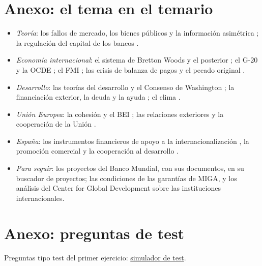 \documentclass[11pt]{article}
\begin{document}
\section{Anexo: el tema en el temario}\label{anexo:temas}

\begin{itemize}
\item \emph{Teoría}: los fallos de mercado, los bienes públicos y la información asimétrica  ; la regulación del capital de los bancos .
\item \emph{Economía internacional}: el sistema de Bretton Woods  y el posterior ; el G-20 y la OCDE ; el FMI ; las crisis de balanza de pagos y el pecado original .
\item \emph{Desarrollo}: las teorías del desarrollo y el Consenso de Washington ; la financiación exterior, la deuda y la ayuda ; el clima .
\item \emph{Unión Europea}: la cohesión y el BEI ; las relaciones exteriores y la cooperación de la Unión .
\item \emph{España}: los instrumentos financieros de apoyo a la internacionalización , la promoción comercial  y la cooperación al desarrollo .
\end{itemize}

\begin{anotaciones}
\begin{itemize}
\item \emph{Para seguir}: los proyectos del Banco Mundial, con sus documentos, en su buscador de proyectos\nocite{BM2026Proyectos}; las condiciones de las garantías de MIGA\nocite{MIGA2026Garantias}, y los análisis del Center for Global Development sobre las instituciones internacionales\nocite{CGD2026Instituciones}.
\end{itemize}
\end{anotaciones}

\section{Anexo: preguntas de test}\label{anexo:test}

\begin{anotaciones}
Preguntas tipo test del primer ejercicio: \href{https://www.victorgutierrezmarcos.es/oposicion/temario/primer-ejercicio/test/simulador.html?tema=3.B.30}{simulador de test}.
\end{anotaciones}

\bibliografia
\end{document}

